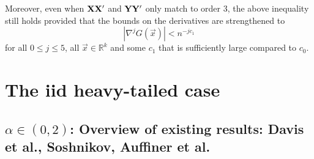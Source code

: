 \documentclass[11pt,reqno]{amsart}
\newcommand{\1}{\mathds{1}}
\newcommand{\0}{\boldsymbol{0}}
\newcommand{\4}{\mathchoice{\mskip1.5mu}{\mskip1.5mu}{}{}}
\newcommand{\5}{\mathchoice{\mskip-1.5mu}{\mskip-1.5mu}{}{}}
\newcommand{\2}{\penalty250\mskip\thickmuskip\mskip-\thinmuskip} %
\begin{document}
Moreover, even when ${\bf XX'}$ and ${\bf YY'}$ only match to order
3, the above inequality still holds provided that the bounds on the
derivatives are strengthened to
\[
|\nabla^j G(\vec x)| < n^{-j c_1}
\]
for all $0 \leq j \leq 5$, all $\vec x \in \mathbb R^k$ and some $c_1$
that is sufficiently large compared to $c_0$.

\section{The iid heavy-tailed case}

\subsection{\texorpdfstring{$\alpha \in (0,2)$}{alpha in (0,2)}:
  Overview of existing results: Davis et al., Soshnikov, Auffiner et
  al.}
\end{document}
